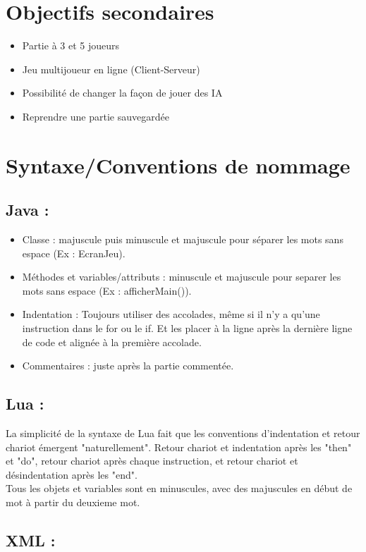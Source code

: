 \documentclass[a4paper]{report}
\begin{document}
	\section{Objectifs secondaires}
		\begin{itemize}
			\item Partie à 3 et 5 joueurs
			\item Jeu multijoueur en ligne (Client-Serveur)
			\item Possibilité de changer la façon de jouer des IA
			\item Reprendre une partie sauvegardée
		\end{itemize}
	\section{Syntaxe/Conventions de nommage}

		\subsection{Java :}
			\begin{itemize}
				\item Classe : majuscule puis minuscule et majuscule pour séparer les mots sans espace (Ex : EcranJeu).
				\item Méthodes et variables/attributs : minuscule et majuscule pour separer les mots sans espace (Ex : afficherMain()).
				\item Indentation : Toujours utiliser des accolades, même si il n'y a qu'une instruction dans le for ou le if. Et les placer à la ligne après la dernière ligne de code 					et alignée à la première accolade.
				\item Commentaires : juste après la partie commentée.
			\end{itemize}
		\subsection{Lua :}

		La simplicité de la syntaxe de Lua fait que les conventions d'indentation et retour chariot émergent "naturellement". Retour chariot et indentation après les "then" et  "do", retour 			chariot après chaque instruction, et retour chariot et désindentation après les "end".\\
		Tous les objets et variables sont en minuscules, avec des majuscules en début de mot à partir du deuxieme mot.\\


		\subsection{XML :}
\end{document}

